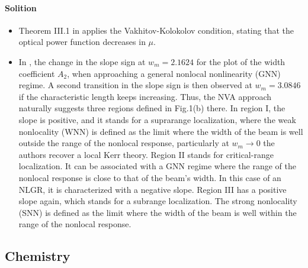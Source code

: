 \documentclass[11pt]{book}
\begin{document}
\paragraph{Solition}
\begin{itemize}
\item Theorem III.1 in \cite{sivan2008qualitative}
applies the Vakhitov-Kolokolov condition, stating that the optical
power function decreases in $\mu$.
\item In \cite{duque2019generation},
the change in the slope sign at $w_{m}=2.1624$ for the plot of the
width coefficient $A_{2}$, when approaching a general nonlocal nonlinearity
(GNN) regime. A second transition in the slope sign is then observed
at $w_{m}=3.0846$ if the characteristic length keeps increasing.
Thus, the NVA approach naturally suggests three regions defined in
Fig.1(b) there. In region I, the slope is positive, and it stands
for a suprarange localization, where the weak nonlocality (WNN) is
defined as the limit where the width of the beam is well outside the
range of the nonlocal response, particularly at $w_{m}\rightarrow0$
the authors recover a local Kerr theory. Region II stands for critical-range
localization. It can be associated with a GNN regime where the range
of the nonlocal response is close to that of the beam's width. In
this case of an NLGR, it is characterized with a negative slope. Region
III has a positive slope again, which stands for a subrange localization.
The strong nonlocality (SNN) is defined as the limit where the width
of the beam is well within the range of the nonlocal response.
\end{itemize}

\subsection{Chemistry}
\end{document}
